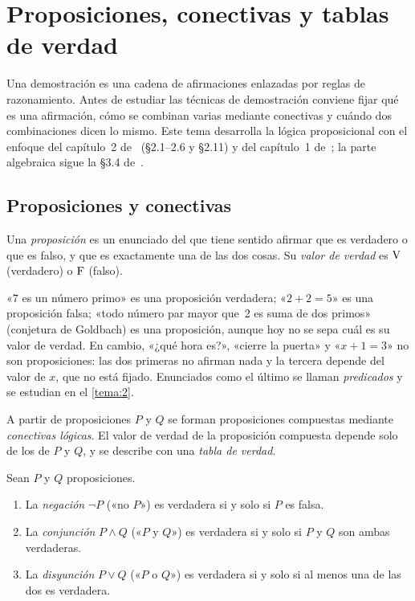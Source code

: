 \chapter{Proposiciones, conectivas y tablas de verdad}
\label{tema:1}

Una demostración es una cadena de afirmaciones enlazadas por reglas de razonamiento. Antes de estudiar las técnicas de demostración conviene fijar qué es una afirmación, cómo se combinan varias mediante conectivas y cuándo dos combinaciones dicen lo mismo. Este tema desarrolla la lógica proposicional con el enfoque del capítulo~2 de~\cite{hammack} (§2.1–2.6 y §2.11) y del capítulo~1 de~\cite{velleman}; la parte algebraica sigue la §3.4 de~\cite{mcs}.

\section{Proposiciones y conectivas}

\begin{definicion}[Proposición]\label{def:proposicion}
Una \emph{proposición} es un enunciado del que tiene sentido afirmar que es verdadero o que es falso, y que es exactamente una de las dos cosas. Su \emph{valor de verdad} es $\mathrm{V}$ (verdadero) o $\mathrm{F}$ (falso).
\end{definicion}

\begin{ejemplo}\label{ej:proposiciones}
«$7$ es un número primo» es una proposición verdadera; «$2+2=5$» es una proposición falsa; «todo número par mayor que~2 es suma de dos primos» (conjetura de Goldbach) es una proposición, aunque hoy no se sepa cuál es su valor de verdad. En cambio, «¿qué hora es?», «cierre la puerta» y «$x+1=3$» no son proposiciones: las dos primeras no afirman nada y la tercera depende del valor de $x$, que no está fijado. Enunciados como el último se llaman \emph{predicados} y se estudian en el \cref{tema:2}.
\end{ejemplo}

A partir de proposiciones $P$ y $Q$ se forman proposiciones compuestas mediante \emph{conectivas lógicas}. El valor de verdad de la proposición compuesta depende solo de los de $P$ y $Q$, y se describe con una \emph{tabla de verdad}.

\begin{definicion}\label{def:conectivas}
Sean $P$ y $Q$ proposiciones.
\begin{enumerate}
  \item La \emph{negación} $\neg P$ («no $P$») es verdadera si y solo si $P$ es falsa.
  \item La \emph{conjunción} $P\wedge Q$ («$P$ y $Q$») es verdadera si y solo si $P$ y $Q$ son ambas verdaderas.
  \item La \emph{disyunción} $P\vee Q$ («$P$ o $Q$») es verdadera si y solo si al menos una de las dos es verdadera.
\end{enumerate}
\end{definicion}

